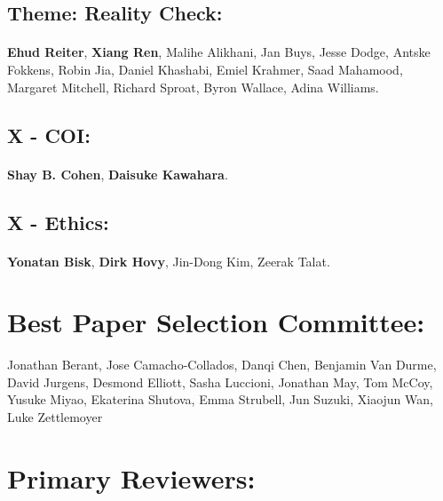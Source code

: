 \subsection*{Theme: Reality Check:}
\paragraph{}\textbf{Ehud Reiter}, \textbf{Xiang Ren}, Malihe Alikhani, Jan Buys, Jesse Dodge, Antske Fokkens, Robin Jia, Daniel Khashabi, Emiel Krahmer, Saad Mahamood, Margaret Mitchell, Richard Sproat, Byron Wallace, Adina Williams.
\subsection*{X - COI:}
\paragraph{}\textbf{Shay B. Cohen}, \textbf{Daisuke Kawahara}.
\subsection*{X - Ethics:}
\paragraph{}\textbf{Yonatan Bisk}, \textbf{Dirk Hovy}, Jin-Dong Kim, Zeerak Talat.




\section*{Best Paper Selection Committee:}

Jonathan Berant, Jose Camacho-Collados, Danqi Chen, Benjamin Van Durme, David Jurgens, Desmond Elliott, Sasha Luccioni, Jonathan May, Tom McCoy, Yusuke Miyao, Ekaterina Shutova, Emma Strubell, 
Jun Suzuki, Xiaojun Wan, Luke Zettlemoyer

\section*{Primary Reviewers:}

